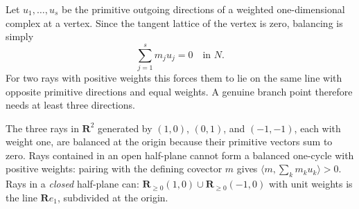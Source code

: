 \begin{example}
\label{ex:ch10-vertex-equation}
Let $u_1,\ldots,u_s$ be the primitive outgoing directions of a weighted
one-dimensional complex at a vertex.  Since the tangent lattice of the
vertex is zero,
balancing is simply
\[
                         \sum_{j=1}^s m_j u_j=0
                         \quad\text{in }N.
\]
For two rays with positive weights this forces them to lie on the same line
with opposite primitive directions and equal weights.  A genuine branch
point therefore needs at least three directions.
\end{example}

\begin{example}
\label{ex:ch10-tropical-line}
The three rays in $\mathbf R^2$ generated by
$(1,0)$, $(0,1)$, and $(-1,-1)$, each with weight one, are balanced at the
origin because their primitive vectors sum to zero. Rays contained in an
open half-plane cannot form a balanced one-cycle with positive weights:
pairing with the defining covector $m$ gives
$\langle m,\sum_km_ku_k\rangle>0$.  Rays in a \emph{closed} half-plane
can: $\mathbf R_{\geq0}(1,0)\cup\mathbf R_{\geq0}(-1,0)$ with unit
weights is the line $\mathbf Re_1$, subdivided at the origin.
\end{example}

